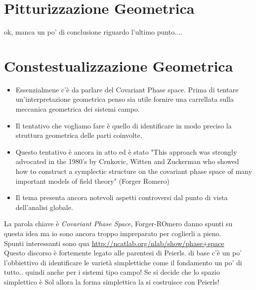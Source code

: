 \documentclass[Main]{subfiles}
\begin{document}
	\newpage
	\section{Pitturizzazione Geometrica}
		ok, manca un po' di conclusione riguardo l'ultimo punto....



	\newpage
	\section{Constestualizzazione Geometrica}
	\begin{itemize}
		\item 	Essenzialmene c'è da parlare del Covariant Phase space. Prima di tentare un'interpretazione geometrica penso sia utile fornire una carrellata sulla meccanica geometrica dei sistemi campo.
		\item 	Il tentativo che vogliamo fare è quello di identificare in modo preciso la struttura geometrica delle parti coinvolte.
		\item Questo tentativo è ancora in atto ed è stato "This approach was strongly advocated in the 1980’s by Crnkovic, Witten and Zuckerman who showed how to construct a symplectic structure on the covariant phase space of many important models of field theory" (Forger Romero)
		\item Il tema presenta ancora notevoli aspetti controversi dal punto di vista dell'analisi globale.
	\end{itemize}
	
	\begin{Warning}
		La parola chiave è \emph{Covariant Phase Space}, Forger-ROmero danno spunti su questa idea ma io sono ancora troppo impreparato per coglierli a pieno.\\
		Spunti interessanti sono qua \url{http://ncatlab.org/nlab/show/phase+space}
		\\
		Questo discorso è fortemente legato alle parentesi di Peierls. di base c'è un po' l'obbiettivo di identificare le varietà simplettiche come il fondamento un po' di tutto.. quindi anche per i sistemi tipo campo!
		Se si decide che lo spazio simplettico è Sol allora la forma simplettica la si costruisce con  Peierls!
	\end{Warning}	
	
\end{document}

